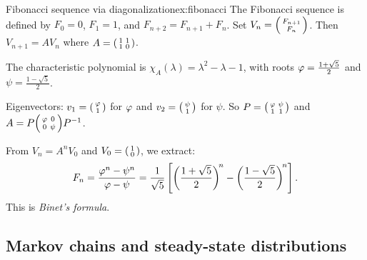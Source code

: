 \begin{example}{Fibonacci sequence via diagonalization}{ex:fibonacci}
The Fibonacci sequence is defined by $F_0 = 0$, $F_1 = 1$, and
$F_{n+2} = F_{n+1} + F_n$.  Set
$V_n = \begin{psmallmatrix} F_{n+1} \\ F_n \end{psmallmatrix}$.  Then
$V_{n+1} = A V_n$ where
$A = \begin{psmallmatrix} 1 & 1 \\ 1 & 0 \end{psmallmatrix}$.

The characteristic polynomial is $\chi_A(\lambda) = \lambda^2 - \lambda - 1$,
with roots $\varphi = \frac{1+\sqrt{5}}{2}$ and
$\psi = \frac{1-\sqrt{5}}{2}$.

Eigenvectors:
$v_1 = \begin{psmallmatrix}\varphi\\1\end{psmallmatrix}$ for $\varphi$
and $v_2 = \begin{psmallmatrix}\psi\\1\end{psmallmatrix}$ for $\psi$.
So $P = \begin{psmallmatrix}\varphi & \psi \\ 1 & 1\end{psmallmatrix}$
and
$A = P\begin{psmallmatrix}\varphi & 0 \\ 0 & \psi\end{psmallmatrix}{P}^{-1}$.

From $V_n = A^n V_0$ and $V_0 = \begin{psmallmatrix}1\\0\end{psmallmatrix}$,
we extract:
\[
  F_n = \frac{\varphi^n - \psi^n}{\varphi - \psi}
  = \frac{1}{\sqrt{5}}\left[\left(\frac{1+\sqrt{5}}{2}\right)^{\!n}
    - \left(\frac{1-\sqrt{5}}{2}\right)^{\!n}\right].
\]
This is \emph{Binet's formula}.
\end{example}

\subsection{Markov chains and steady-state distributions}%
\label{subsec:markov}

